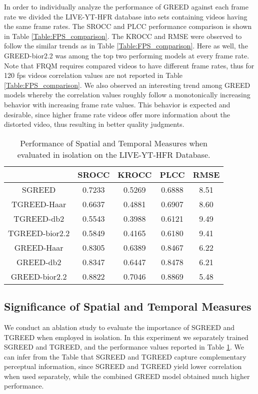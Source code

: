 \documentclass[journal]{IEEEtran}
\begin{document}
In order to individually analyze the performance of GREED against each frame rate we divided the LIVE-YT-HFR database into sets containing videos having the same frame rates. The SROCC and PLCC performance comparison is shown in Table \ref{Table:FPS_comparison}. The KROCC and RMSE were observed to follow the similar trends as in Table \ref{Table:FPS_comparison}. Here as well, the GREED-bior2.2 was among the top two performing models at every frame rate. Note that FRQM requires compared videos to have different frame rates, thus for 120 fps videos correlation values are not reported in Table \ref{Table:FPS_comparison}. We also observed an interesting trend among GREED models whereby the correlation values roughly follow a monotonically increasing behavior with increasing frame rate values. This behavior is expected and desirable, since higher frame rate videos offer more information about the distorted video, thus resulting in better quality judgments.

\begin{table}[t]
\caption{Performance of Spatial and Temporal Measures when evaluated in isolation on the LIVE-YT-HFR Database.}
    \label{Table:individual_component}
    \centering
    \footnotesize
    \begin{tabular}{|c||c|c|c|c|}
        \hline
        ~    & SROCC  & KROCC  & PLCC  & RMSE  \\ \hline \hline
        SGREED & 0.7233 & 0.5269 & 0.6888 & 8.51 \\ 
        TGREED-Haar & 0.6637 & 0.4881 & 0.6907 & 8.60 \\ 
        TGREED-db2 & 0.5543 & 0.3988 & 0.6121 & 9.49 \\
        TGREED-bior2.2 & 0.5849 & 0.4165 & 0.6180 & 9.41 \\ \hline
        GREED-Haar & 0.8305 & 0.6389 & 0.8467 & 6.22 \\
        GREED-db2 & 0.8347 & 0.6447 & 0.8478 & 6.21 \\
        GREED-bior2.2 & 0.8822 & 0.7046 & 0.8869 & 5.48 \\
        \hline
    \end{tabular}
\end{table}

\subsection{Significance of Spatial and Temporal Measures}
We conduct an ablation study to evaluate the importance of SGREED and TGREED when employed in isolation. In this experiment we separately trained SGREED and TGREED, and the performance values reported in Table \ref{Table:individual_component}. We can infer from the Table that SGREED and TGREED capture complementary perceptual information, since SGREED and TGREED yield lower correlation when used separately, while the combined GREED model obtained much higher performance.
\end{document}
